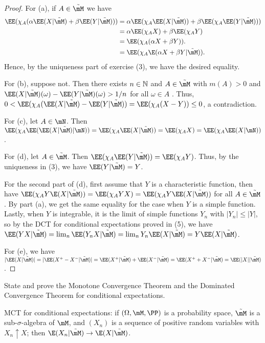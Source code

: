 \documentclass{article}
\begin{document}
\begin{proof}
For (a), if $A \in \tilde \mM$ we have
\begin{align*}
\EE( \chi_A (\alpha \EE(X | \tilde \mM) + \beta \EE(Y | \tilde \mM))) & = \alpha \EE( \chi_A \EE(X | \tilde \mM)) + \beta \EE(\chi_A \EE(Y | \tilde \mM))) 
\\ & = \alpha \EE(\chi_A X) + \beta \EE(\chi_A Y)
\\ & = \EE(\chi_A (\alpha X + \beta Y)).
\\ & = \EE(\chi_A \E(\alpha X + \beta Y | \tilde \mM)).
\end{align*}
Hence, by the uniqueness part of exercise (3), we have the desired equality.

For (b), suppose not.  Then there exists $n \in \mathbb{N}$ and $A \in \tilde \mM$ with $m(A) > 0$ and $\EE(X | \tilde \mM)(\omega) - \EE(Y | \tilde \mM)(\omega) > 1/n$ for all $\omega \in A$ .  Thus, $0 < \EE(\chi_A(\EE(X | \tilde \mM) - \EE(Y | \tilde \mM)) =\EE(\chi_A (X -Y))  \le 0$, a contradiction.

For (c), let $A \in \mN$. Then $\EE(\chi_A \EE(\EE(X | \tilde \mM) | \mN)) = \EE(\chi_A \EE(X | \tilde \mM))  = \EE(\chi_A X) = \EE(\chi_A \EE(X | \mN))$. 

For (d), let $A \in \tilde \mM$. Then $\EE( \chi_A \EE(Y | \tilde \mM)) = \EE(\chi_A Y)$. Thus, by the uniqueness in (3), we have $\EE(Y | \tilde \mM) = Y$.  

For the second part of (d), first assume that $Y$ is a characteristic function, then have $\EE(\chi_A Y \E(X | \tilde \mM)) = \EE(\chi_A Y X) =  \EE(\chi_A Y \EE(X | \tilde \mM))$ for all $A \in \tilde \mM$.  By part (a), we get the same equality for the case when $Y$ is a simple function.  Lastly, when $Y$ is integrable, it is the limit of simple functions $Y_n$ with $|Y_n| \le |Y|$, so by the DCT for conditional expectations proved in (5), we have
$\EE(YX | \tilde \mM) = \lim_n \EE(Y_n X | \tilde \mM) = \lim_n Y_n \EE(X | \tilde \mM) = Y \EE(X | \tilde \mM)$.

For (e), we have $|\EE(X | \tilde \mM)| = |\EE(X^+ - X^- | \tilde \mM)| =  \EE(X^+| \tilde \mM) + \EE( X^- | \tilde \mM)  =  \EE(X^+ + X^-| \tilde \mM) =  \EE(|X| | \tilde \mM) $.
\end{proof}


 State and prove the Monotone Convergence Theorem and the Dominated Convergence Theorem for conditional expectations.

MCT for conditional expectations: if $(\Omega, \mM , {\PP})$ is a probability space, $\tilde \mM$ is a sub-$\sigma$-algebra of $\mM$, and $(X_n)$ is a sequence of positive random variables with $X_n \uparrow X$; then $\E(X_n | \tilde \mM) \to \E(X | \tilde \mM)$.
\end{document}
